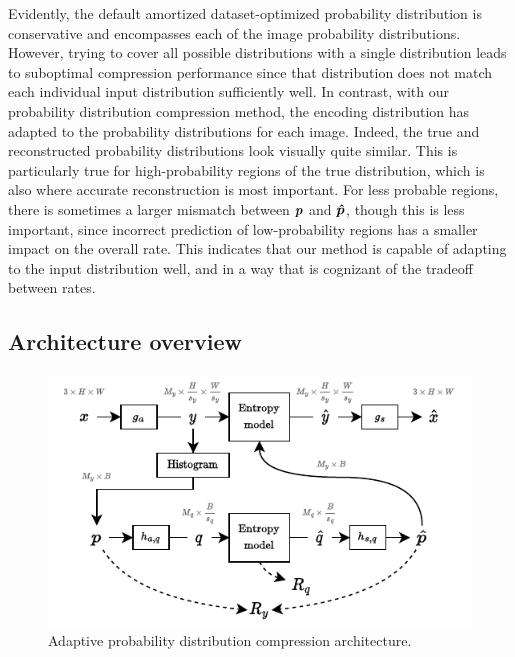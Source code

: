 Evidently, the default amortized dataset-optimized probability distribution is conservative and encompasses each of the image probability distributions.
However, trying to cover all possible distributions with a single distribution leads to suboptimal compression performance since that distribution does not match each individual input distribution sufficiently well.
In contrast, with our probability distribution compression method, the encoding distribution has adapted to the probability distributions for each image.
Indeed, the true and reconstructed probability distributions look visually quite similar.
This is particularly true for high-probability regions of the true distribution, which is also where accurate reconstruction is most important.
For less probable regions, there is sometimes a larger mismatch between ${\boldsymbol{p}}$ and ${\boldsymbol{\hat{p}}}$, though this is less important, since incorrect prediction of low-probability regions has a smaller impact on the overall rate.
This indicates that our method is capable of adapting to the input distribution well, and in a way that is cognizant of the tradeoff between rates.




\subsection{Architecture overview}
\label{sec:pdf_compression/architecture_overview}

\begin{figure}[htbp]
  \centering
  \includegraphics[width=\linewidth]{img/pdf_compression/arch-overview.pdf}
  \caption[Adaptive probability distribution compression architecture]{%
    Adaptive probability distribution compression architecture.%
  }
  \label{fig:pdf/arch}
\end{figure}

